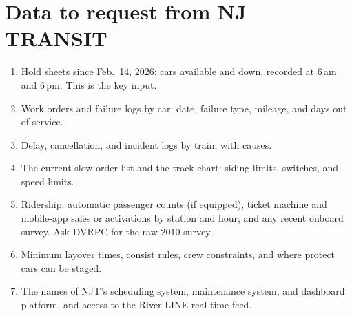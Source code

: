 \documentclass[11pt]{article}
\begin{document}
\section{Data to request from NJ TRANSIT}
\begin{enumerate}
\item Hold sheets since Feb.~14, 2026: cars available and down, recorded at 6\,am and 6\,pm. This is the key input.
\item Work orders and failure logs by car: date, failure type, mileage, and days out of service.
\item Delay, cancellation, and incident logs by train, with causes.
\item The current slow-order list and the track chart: siding limits, switches, and speed limits.
\item Ridership: automatic passenger counts (if equipped), ticket machine and mobile-app sales or activations by station and hour, and any recent onboard survey. Ask DVRPC for the raw 2010 survey.
\item Minimum layover times, consist rules, crew constraints, and where protect cars can be staged.
\item The names of NJT's scheduling system, maintenance system, and dashboard platform, and access to the River LINE real-time feed.
\end{enumerate}
\end{document}
